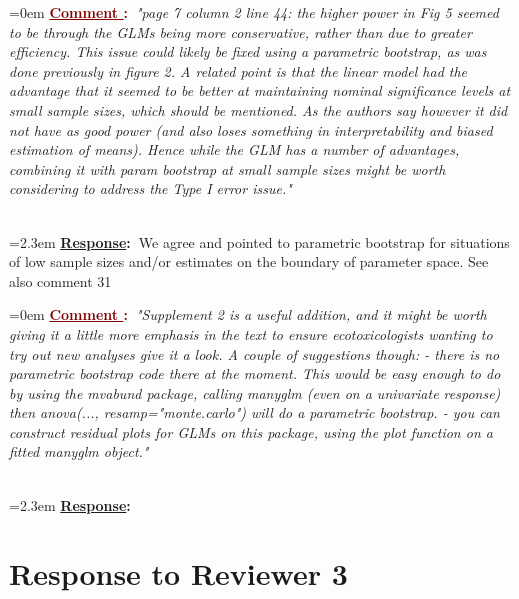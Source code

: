 \documentclass[12pt]{article}
\newcounter{cN}
\newcommand{\comment}[1]{
	\vspace{2em} 
	\refstepcounter{cN} %
	\noindent \hangindent=0em \textbf{\textcolor{Maroon}{\uline{Comment \thecN}:~}}\emph{"#1"}
	}
\newcommand{\response}[1]{
	\\[0.25em] 
	\hangindent=2.3em \textbf{\textcolor{NavyBlue}{\uline{Response}:~}}#1 
	}
\begin{document}
\comment{page 7 column 2 line 44: the higher power in Fig 5 seemed to be through the GLMs being more conservative, rather than due to greater efficiency.  This issue could likely be fixed using a parametric bootstrap, as was done previously in figure 2.
A related point is that the linear model had the advantage that it seemed to be better at maintaining nominal significance levels at small sample sizes, which should be mentioned.  As the authors say however it did not have as good power (and also loses something in interpretability and biased estimation of means).  Hence while the GLM has a number of advantages, combining it with param bootstrap at small sample sizes might be worth considering to address the Type I error issue.}
\response{We agree and pointed to parametric bootstrap for situations of low sample sizes and/or estimates on the boundary of parameter space. See also comment 31}


\comment{Supplement 2 is a useful addition, and it might be worth giving it a little more emphasis in the text to ensure ecotoxicologists wanting to try out new analyses give it a look.  A couple of suggestions though:
- there is no parametric bootstrap code there at the moment.  This would be easy enough to do by using the mvabund package, calling manyglm (even on a univariate response) then anova(..., resamp="monte.carlo")  will do a parametric bootstrap.
- you can construct residual plots for GLMs on this package, using the plot function on a fitted manyglm object.}
\response{}


\section{Response to Reviewer 3}
\vspace{-2em}
\end{document}
